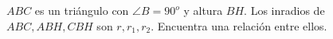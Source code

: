 $ABC$ es un triángulo con $\angle B = 90^o$ y altura $BH$. Los inradios de $ABC, ABH, CBH$ son $r, r_1, r_2$. Encuentra una relación entre ellos. 
